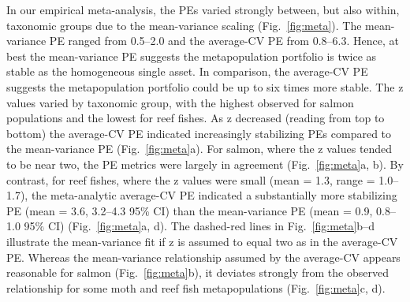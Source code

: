 In our empirical meta-analysis, the PEs varied strongly between, but also
within, taxonomic groups due to the mean-variance scaling
(Fig.~\ref{fig:meta}). The mean-variance PE ranged from
0.5--2.0 and the average-CV PE from
0.8--6.3. Hence, at best the
mean-variance PE suggests the metapopulation portfolio is twice as stable as
the homogeneous single asset. In comparison, the average-CV PE suggests the
metapopulation portfolio could be up to six times more stable. The z values
varied by taxonomic group, with the highest observed for salmon populations and
the lowest for reef fishes. As z decreased (reading from top to bottom) the
average-CV PE indicated increasingly stabilizing PEs compared to the
mean-variance PE (Fig.~\ref{fig:meta}a). For salmon, where the z values tended
to be near two, the PE metrics were largely in agreement (Fig.~\ref{fig:meta}a,
b). By contrast, for reef fishes, where the z values were small (mean =
1.3, range = 1.0--1.7),
the meta-analytic average-CV PE indicated a substantially more stabilizing PE
(mean = 3.6,
3.2--4.3 95\% CI) than the
mean-variance PE (mean = 0.9,
0.8--1.0 95\% CI) (Fig.~\ref{fig:meta}a,
d). The dashed-red lines in Fig.~\ref{fig:meta}b--d illustrate the
mean-variance fit if z is assumed to equal two as in the average-CV PE. Whereas
the mean-variance relationship assumed by the average-CV appears reasonable for
salmon (Fig.~\ref{fig:meta}b), it deviates strongly from the observed
relationship for some moth and reef fish metapopulations (Fig.~\ref{fig:meta}c,
d).

